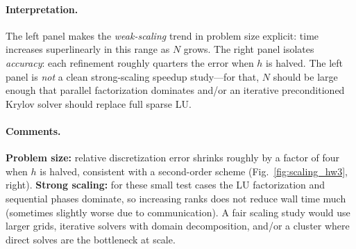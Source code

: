 \documentclass[11pt]{article}
\begin{document}
\paragraph{Interpretation.}
The left panel makes the \emph{weak-scaling} trend in problem size explicit: time increases superlinearly in this range as $N$ grows. The right panel isolates \emph{accuracy}: each refinement roughly quarters the error when $h$ is halved. The left panel is \emph{not} a clean strong-scaling speedup study---for that, $N$ should be large enough that parallel factorization dominates and/or an iterative preconditioned Krylov solver should replace full sparse LU.

\paragraph{Comments.}
\textbf{Problem size:} relative discretization error shrinks roughly by a factor of four when $h$ is halved, consistent with a second-order scheme (Fig.~\ref{fig:scaling_hw3}, right). \textbf{Strong scaling:} for these small test cases the LU factorization and sequential phases dominate, so increasing ranks does not reduce wall time much (sometimes slightly worse due to communication). A fair scaling study would use larger grids, iterative solvers with domain decomposition, and/or a cluster where direct solves are the bottleneck at scale.

  
\end{document}
